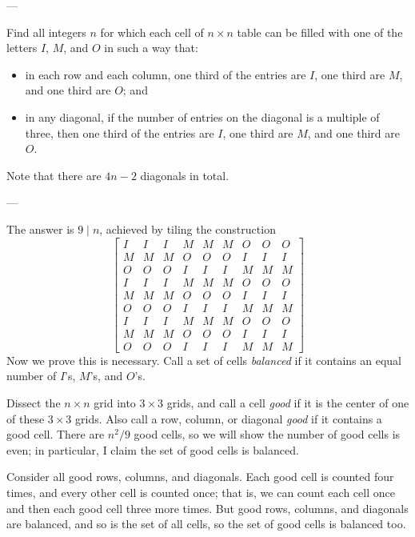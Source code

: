 
---

Find all integers $n$ for which each cell of $n\times n$ table can be filled with one of the letters $I$, $M$, and $O$ in such a way that:
\begin{itemize}
    \item in each row and each column, one third of the entries are $I$, one third are $M$, and one third are $O$; and 
    \item in any diagonal, if the number of entries on the diagonal is a multiple of three, then one third of the entries are $I$, one third are $M$, and one third are $O$.
\end{itemize}
Note that there are $4n-2$ diagonals in total.

---

The answer is $9\mid n$, achieved by tiling the construction
\[
    \begin{bmatrix}
        I&I&I&M&M&M&O&O&O\\
        M&M&M&O&O&O&I&I&I\\
        O&O&O&I&I&I&M&M&M\\
        I&I&I&M&M&M&O&O&O\\
        M&M&M&O&O&O&I&I&I\\
        O&O&O&I&I&I&M&M&M\\
        I&I&I&M&M&M&O&O&O\\
        M&M&M&O&O&O&I&I&I\\
        O&O&O&I&I&I&M&M&M
    \end{bmatrix}
\]
Now we prove this is necessary. Call a set of cells \emph{balanced} if it contains an equal number of $I$'s, $M$'s, and $O$'s.

Dissect the $n\times n$ grid into $3\times3$ grids, and call a cell \emph{good} if it is the center of one of these $3\times3$ grids. Also call a row, column, or diagonal \emph{good} if it contains a good cell. There are $n^2/9$ good cells, so we will show the number of good cells is even; in particular, I claim the set of good cells is balanced.

Consider all good rows, columns, and diagonals. Each good cell is counted four times, and every other cell is counted once; that is, we can count each cell once and then each good cell three more times. But good rows, columns, and diagonals are balanced, and so is the set of all cells, so the set of good cells is balanced too.

